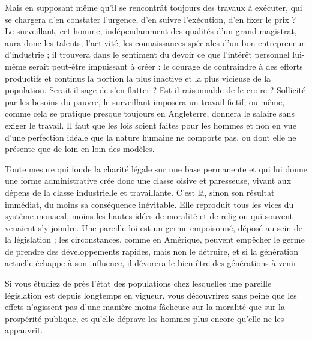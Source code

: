 \documentclass[french,twoside]{book} %
\begin{document}
Mais en supposant même qu’il se rencontrât toujours des travaux à exécuter, qui se chargera d’en constater l’urgence, d’en suivre l’exécution, d’en fixer le prix ? Le surveillant, cet homme, indépendamment des qualités d’un grand magistrat, aura donc les talents, l’activité, les connaissances spéciales d’un bon entrepreneur d’industrie ; il trouvera dans le sentiment du devoir ce que l’intérêt personnel lui-même serait peut-être impuissant à créer : le courage de contraindre à des efforts productifs et continus la portion la plus inactive et la plus vicieuse de la population. Serait-il sage de s’en flatter ? Est-il raisonnable de le croire ? Sollicité par les besoins du pauvre, le surveillant imposera un travail fictif, ou même, comme cela se pratique presque toujours en Angleterre, donnera le salaire sans exiger le travail. Il faut que les lois soient faites pour les hommes et non en vue d’une perfection idéale que la nature humaine ne comporte pas, ou dont elle ne présente que de loin en loin des modèles.\par
Toute mesure qui fonde la charité légale sur une base permanente et qui lui donne une forme administrative crée donc une classe oisive et paresseuse, vivant aux dépens de la classe industrielle et travaillante. C'est là, sinon son résultat immédiat, du moins sa conséquence inévitable. Elle reproduit tous les vices du système monacal, moins les hautes idées de moralité et de religion qui souvent venaient s’y joindre. Une pareille loi est un germe empoisonné, déposé au sein de la législation ; les circonstances, comme en Amérique, peuvent empêcher le germe de prendre des développements rapides, mais non le détruire, et si la génération actuelle échappe à son influence, il dévorera le bien-être des générations à venir.\par
Si vous étudiez de près l’état des populations chez lesquelles une pareille législation est depuis longtemps en vigueur, vous découvrirez sans peine que les effets n’agissent pas d’une manière moins fâcheuse sur la moralité que sur la prospérité publique, et qu’elle déprave les hommes plus encore qu’elle ne les appauvrit.\par
\end{document}

